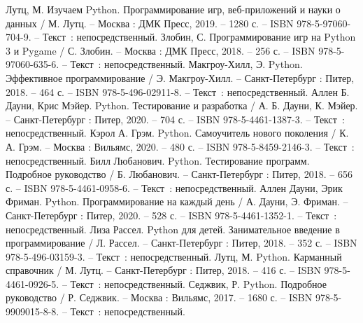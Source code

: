 
\begin{thebibliography}{9}

     Лутц, М. Изучаем Python. Программирование игр, веб-приложений и науки о данных / М. Лутц. – Москва : ДМК Пресс, 2019. – 1280 с. – ISBN 978-5-97060-704-9. – Текст~: непосредственный.
     Злобин, С. Программирование игр на Python 3 и Pygame / С. Злобин. – Москва : ДМК Пресс, 2018. – 256 с. – ISBN 978-5-97060-635-6. – Текст~: непосредственный.
     Макгроу-Хилл, Э. Python. Эффективное программирование / Э. Макгроу-Хилл. – Санкт-Петербург : Питер, 2018. – 464 с. – ISBN 978-5-496-02911-8. – Текст~: непосредственный.
    	Аллен Б. Дауни, Крис Мэйер. Python. Тестирование и разработка / А. Б. Дауни, К. Мэйер. – Санкт-Петербург : Питер, 2020. – 704 с. – ISBN 978-5-4461-1387-3. – Текст~: непосредственный.
		Кэрол А. Грэм. Python. Самоучитель нового поколения / К. А. Грэм. – Москва : Вильямс, 2020. – 480 с. – ISBN 978-5-8459-2146-3. – Текст~: непосредственный.
		Билл Любанович. Python. Тестирование программ. Подробное руководство / Б. Любанович. – Санкт-Петербург : Питер, 2018. – 656 с. – ISBN 978-5-4461-0958-6. – Текст~: непосредственный.
		Аллен Дауни, Эрик Фриман. Python. Программирование на каждый день / А. Дауни, Э. Фриман. – Санкт-Петербург : Питер, 2020. – 528 с. – ISBN 978-5-4461-1352-1. – Текст~: непосредственный.
		Лиза Рассел. Python для детей. Занимательное введение в программирование / Л. Рассел. – Санкт-Петербург : Питер, 2018. – 352 с. – ISBN 978-5-496-03159-3. – Текст~: непосредственный. 
		Лутц, М. Python. Карманный справочник / М. Лутц. – Санкт-Петербург : Питер, 2018. – 416 с. – ISBN 978-5-4461-0926-5. – Текст~: непосредственный.
		Седжвик, Р. Python. Подробное руководство / Р. Седжвик. – Москва : Вильямс, 2017. – 1680 с. – ISBN 978-5-9909015-8-8. – Текст~: непосредственный.
\end{thebibliography}
